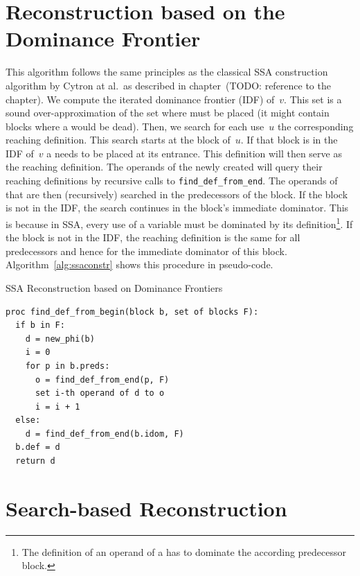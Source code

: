 \section{Reconstruction based on the Dominance Frontier}
This algorithm follows the same principles as the classical SSA construction algorithm by Cytron at al.~as described in chapter~(TODO: reference to the chapter).
We compute the iterated dominance frontier (IDF) of~$v$.
This set is a sound over-approximation of the set where \phifuns must be placed (it might contain blocks where a \phifun would be dead).
Then, we search for each use~$u$ the corresponding reaching definition.
This search starts at the block of~$u$.
If that block is in the IDF of~$v$ a \phifun needs to be placed at its entrance.
This definition will then serve as the reaching definition. 
The operands of the newly created \phifun will query their reaching definitions by recursive calls to \verb|find_def_from_end|.
The operands of that \phifun are then (recursively) searched in the predecessors of the block.
If the block is not in the IDF, the search continues in the block's immediate dominator. 
This is because in SSA, every use of a variable must be dominated by its definition\footnote{The definition of an operand of a \phifun has to dominate the according predecessor block.}.
If the block is not in the IDF, the reaching definition is the same for all predecessors and hence for the immediate dominator of this block.
Algorithm~\ref{alg:ssaconstr} shows this procedure in pseudo-code.

\begin{algorithm}
  \caption{SSA Reconstruction based on Dominance Frontiers}
  \label{alg:ssaconstr}
\begin{verbatim}
proc find_def_from_begin(block b, set of blocks F):
  if b in F:
    d = new_phi(b)
    i = 0
    for p in b.preds: 
      o = find_def_from_end(p, F)
      set i-th operand of d to o
      i = i + 1
  else:
    d = find_def_from_end(b.idom, F)
  b.def = d
  return d
\end{verbatim}
\end{algorithm}

\section{Search-based Reconstruction}

